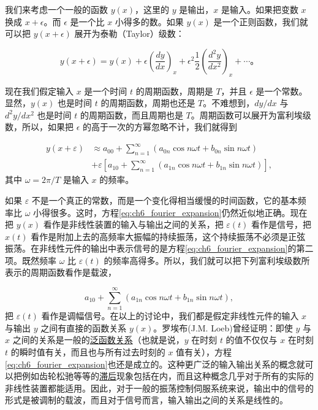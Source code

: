 我们来考虑一个一般的函数 $y(x)$，这里的 $y$ 是输出，$x$ 是输入。如果把变数 $x$ 换成 $x + \epsilon$。而 $\epsilon$ 是一个比 $x$ 小得多的数。如果 $y(x)$ 是一个正则函数，我们就可以把 $y(x+\epsilon)$ 展开为泰勒（Taylor）级数：

\begin{equation}\label{eq:ch6_taylor_series_of_y}
y(x+\epsilon) = y(x) + \epsilon \left( \frac{dy}{dx} \right)_x + \epsilon^2 \frac{1}{2} \left( \frac{d^2 y}{dx^2} \right)_x + \cdots 。
\end{equation}

现在我们假定输入 $x$ 是一个时间 $t$ 的周期函数，周期是 $T$，并且 $\epsilon$ 是一个常数。显然，$y(x)$ 也是时间 $t$ 的周期函数，周期也还是 $T$。不难想到，$dy/dx$ 与 $d^2 y/dx^2$ 也是时间 $t$ 的周期函数，而且周期也是 $T$。周期函数可以展开为富利埃级数，所以，如果把 $\epsilon$ 的高于一次的方幂忽略不计，我们就得到

\begin{equation}\label{eq:ch6_fourier_expansion}
\begin{array}{ll}
y(x + \varepsilon) &\approx a_{00} + \sum_{n=1}^{\infty} (a_{0n} \cos n \omega t + b_{0n} \sin n \omega t) \\
&+ \varepsilon \left[ a_{10} + \sum_{n=1}^{\infty} (a_{1n} \cos n \omega t + b_{1n} \sin n \omega t) \right],
\end{array}
\end{equation}
其中 $\omega = 2\pi / T$ 是输入 $x$ 的频率。

如果 $\varepsilon$ 不是一个真正的常数，而是一个变化得相当缓慢的时间函数，它的基本频率比 $\omega$ 小得很多。这时，方程\eqref{eq:ch6_fourier_expansion}仍然近似地正确。现在把 $y(x)$ 看作是非线性装置的输入与输出之间的关系，把 $\varepsilon(t)$ 看作是信号，把 $x(t)$ 看作是附加上去的高频率大振幅的持续振荡，这个持续振荡不必须是正弦振荡。在非线性元件的输出中表示信号的是方程\eqref{eq:ch6_fourier_expansion}的第二项。既然频率 $\omega$ 比 $\varepsilon(t)$ 的频率高得多。所以，我们就可以把下列富利埃级数所表示的周期函数看作是载波，

\begin{equation*}
a_{10} + \sum_{n=1}^{\infty} (a_{1n} \cos n \omega t + b_{1n} \sin n \omega t),
\end{equation*}
把 $\varepsilon(t)$ 看作是调幅信号。在以上的讨论中，我们都是假定非线性元件的输入 $x$ 与输出 $y$ 之间有直接的函数关系 $y(x)$。罗埃布(J.M. Loeb)曾经证明：即使 $y$ 与 $x$ 之间的关系是一般的\underline{泛函数关系}（也就是说，$y$ 在时刻 $t$ 的值不仅仅与 $x$ 在时刻 $t$ 的瞬时值有关，而且也与所有过去时刻的 $x$ 值有关），方程\eqref{eq:ch6_fourier_expansion}也还是成立的。这种更广泛的输入输出关系的概念就可以把例如齿轮松驰等等的\underline{滞后}现象包括在内，而且这种概念几乎对于所有的实际的非线性装置都能适用。因此，对于一般的振荡控制伺服系统来说，输出中的信号的形式是被调制的载波，而且对于信号而言，输入输出之间的关系是线性的。

